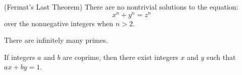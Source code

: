 \documentclass[twoside,12pt]{article}
\begin{document}
\begin{problem}{24}
(Fermat's Last Theorem) There are no nontrivial solutions
to the equation:
\[
x^n + y^n = z^n
\]
over the nonnegative integers when $n > 2$.


There are infinitely many primes.





 If integers $a$ and $b$ are coprime, then there exist integers $x$ and $y$ such that $ax + by = 1$.



\eparts
\end{problem}

\end{document}
